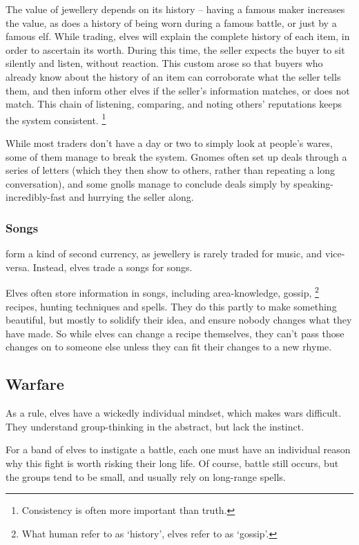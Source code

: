 \begin{multicols}{2}
The value of jewellery depends on its history -- having a famous maker increases the value, as does a history of being worn during a famous battle, or just by a famous elf.
While trading, elves will explain the complete history of each item, in order to ascertain its worth.
During this time, the seller expects the buyer to sit silently and listen, without reaction.
This custom arose so that buyers who already know about the history of an item can corroborate what the seller tells them, and then inform other elves if the seller's information matches, or does not match.
This chain of listening, comparing, and noting others' reputations keeps the system consistent.%
\footnote{Consistency is often more important than truth.}

While most traders don't have a day or two to simply look at people's wares, some of them manage to break the system.
Gnomes often set up deals through a series of letters (which they then show to others, rather than repeating a long conversation), and some gnolls manage to conclude deals simply by {\small speaking-incredibly-fast} and hurrying the seller along.

\subsubsection{Songs}
form a kind of second currency, as jewellery is rarely traded for music, and vice-versa.
Instead, elves trade a songs for songs.

Elves often store information in songs, including area-knowledge, gossip,%
\footnote{What human refer to as `history', elves refer to as `gossip'.}
recipes, hunting techniques and spells.%
They do this partly to make something beautiful, but mostly to solidify their idea, and ensure nobody changes what they have made.
So while elves can change a recipe themselves, they can't pass those changes on to someone else unless they can fit their changes to a new rhyme.

\subsection{Warfare}

As a rule, elves have a wickedly individual mindset, which makes wars difficult.
They understand group-thinking in the abstract, but lack the instinct.

For a band of elves to instigate a battle, each one must have an individual reason why this fight is worth risking their long life.
Of course, battle still occurs, but the groups tend to be small, and usually rely on long-range spells.


\end{multicols}
